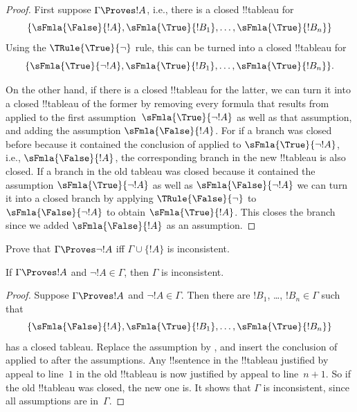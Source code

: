 \begin{proof}
First suppose $\Gamma \Proves !A$, i.e., there is
a closed !!{tableau} for
\[
\{\sFmla{\False}{!A},
\sFmla{\True}{!B_1}, \dots, \sFmla{\True}{!B_n}\}
\]
Using the $\TRule{\True}{\lnot}$ rule, this can be turned into a
closed !!{tableau} for
\[
\{\sFmla{\True}{\lnot !A},
\sFmla{\True}{!B_1}, \dots, \sFmla{\True}{!B_n}\}.
\]

On the other hand, if there is a closed !!{tableau} for the latter, we
can turn it into a closed !!{tableau} of the former by removing every
formula that results from \TRule{\True}{\lnot} applied to the first
assumption~$\sFmla{\True}{\lnot !A}$ as well as that assumption, and
adding the assumption $\sFmla{\False}{!A}$. For if a branch was closed
before because it contained the conclusion of \TRule{\True}{\lnot}
applied to $\sFmla{\True}{\lnot !A}$, i.e., $\sFmla{\False}{!A}$, the
corresponding branch in the new !!{tableau} is also closed. If a
branch in the old tableau was closed because it contained the
assumption $\sFmla{\True}{\lnot !A}$ as well as $\sFmla{\False}{\lnot
  !A}$ we can turn it into a closed branch by applying
$\TRule{\False}{\lnot}$ to $\sFmla{\False}{\lnot !A}$ to obtain
$\sFmla{\True}{!A}$. This closes the branch since we added
$\sFmla{\False}{!A}$ as an assumption.
\end{proof}

\begin{prob}
Prove that $\Gamma \Proves \lnot !A$ iff $\Gamma \cup \{!A\}$ is inconsistent.
\end{prob}

\begin{prop}
  If $\Gamma \Proves !A$ and $\lnot !A \in \Gamma$, then $\Gamma$ is
  inconsistent.
\end{prop}

\begin{proof}
  Suppose $\Gamma \Proves !A$ and $\lnot !A \in \Gamma$.  Then there
  are $!B_1$, \dots, $!B_n \in \Gamma$ such that \
  \[
  \{\sFmla{\False}{!A}, \sFmla{\True}{!B_1}, \dots, \sFmla{\True}{!B_n}\}
  \]
  has a closed tableau. Replace the assumption  by
  \sFmla{\True}{\lnot !A}, and insert the conclusion of
  \TRule{\True}{\lnot} applied to \sFmla{\False}{!A} after the
  assumptions. Any !!{sentence} in the !!{tableau} justified by appeal
  to line~$1$ in the old !!{tableau} is now justified by appeal to
  line~$n+1$. So if the old !!{tableau} was closed, the new one is.
  It shows that $\Gamma$ is inconsistent, since all assumptions are
  in~$\Gamma$.
\end{proof}


